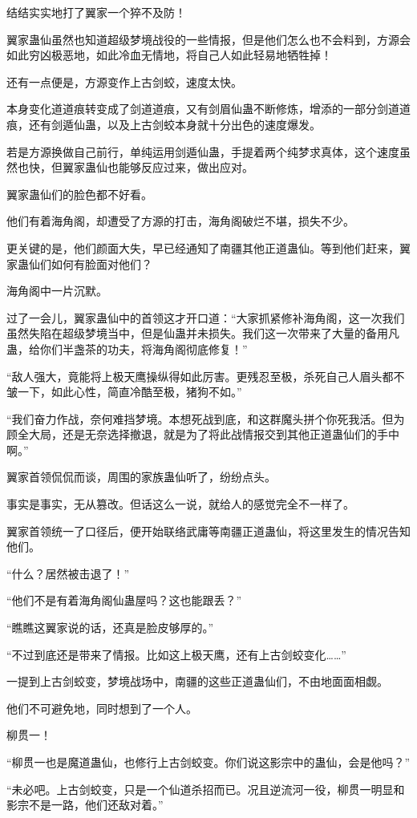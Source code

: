 \begin{this_body}
结结实实地打了翼家一个猝不及防！

翼家蛊仙虽然也知道超级梦境战役的一些情报，但是他们怎么也不会料到，方源会如此穷凶极恶地，如此冷血无情地，将自己人如此轻易地牺牲掉！

还有一点便是，方源变作上古剑蛟，速度太快。

本身变化道道痕转变成了剑道道痕，又有剑眉仙蛊不断修炼，增添的一部分剑道道痕，还有剑遁仙蛊，以及上古剑蛟本身就十分出色的速度爆发。

若是方源换做自己前行，单纯运用剑遁仙蛊，手提着两个纯梦求真体，这个速度虽然也快，但翼家蛊仙也能够反应过来，做出应对。

翼家蛊仙们的脸色都不好看。

他们有着海角阁，却遭受了方源的打击，海角阁破烂不堪，损失不少。

更关键的是，他们颜面大失，早已经通知了南疆其他正道蛊仙。等到他们赶来，翼家蛊仙们如何有脸面对他们？

海角阁中一片沉默。

过了一会儿，翼家蛊仙中的首领这才开口道：“大家抓紧修补海角阁，这一次我们虽然失陷在超级梦境当中，但是仙蛊并未损失。我们这一次带来了大量的备用凡蛊，给你们半盏茶的功夫，将海角阁彻底修复！”

“敌人强大，竟能将上极天鹰操纵得如此厉害。更残忍至极，杀死自己人眉头都不皱一下，如此心性，简直冷酷至极，猪狗不如。”

“我们奋力作战，奈何难挡梦境。本想死战到底，和这群魔头拼个你死我活。但为顾全大局，还是无奈选择撤退，就是为了将此战情报交到其他正道蛊仙们的手中啊。”

翼家首领侃侃而谈，周围的家族蛊仙听了，纷纷点头。

事实是事实，无从篡改。但话这么一说，就给人的感觉完全不一样了。

翼家首领统一了口径后，便开始联络武庸等南疆正道蛊仙，将这里发生的情况告知他们。

“什么？居然被击退了！”

“他们不是有着海角阁仙蛊屋吗？这也能跟丢？”

“瞧瞧这翼家说的话，还真是脸皮够厚的。”

“不过到底还是带来了情报。比如这上极天鹰，还有上古剑蛟变化……”

一提到上古剑蛟变，梦境战场中，南疆的这些正道蛊仙们，不由地面面相觑。

他们不可避免地，同时想到了一个人。

柳贯一！

“柳贯一也是魔道蛊仙，也修行上古剑蛟变。你们说这影宗中的蛊仙，会是他吗？”

“未必吧。上古剑蛟变，只是一个仙道杀招而已。况且逆流河一役，柳贯一明显和影宗不是一路，他们还敌对着。”


\end{this_body}
